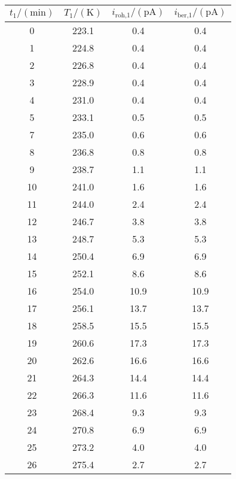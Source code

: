 \label{tab:tabData1_1}
	\begin{tabular}{S[table-format=2.0]S[table-format=3.1]S[table-format=2.1]S[table-format=2.1]}
		\toprule
		{$t_\text{1}/(\si{\minute})$} & {$T_\text{1}/(\si{\kelvin})$} & {$i_\text{roh,1}/(\si{\pico\ampere})$} & {$i_\text{ber,1}/(\si{\pico\ampere})$} \\
		 & 223.1 & 0.4 & 0.4 \\
		 1 & 224.8 & 0.4 & 0.4 \\
		 2 & 226.8 & 0.4 & 0.4 \\
		 3 & 228.9 & 0.4 & 0.4 \\
		 4 & 231.0 & 0.4 & 0.4 \\
		 5 & 233.1 & 0.5 & 0.5 \\
		 7 & 235.0 & 0.6 & 0.6 \\
		 8 & 236.8 & 0.8 & 0.8 \\
		 9 & 238.7 & 1.1 & 1.1 \\
		10 & 241.0 & 1.6 & 1.6 \\
		11 & 244.0 & 2.4 & 2.4 \\
		12 & 246.7 & 3.8 & 3.8 \\
		13 & 248.7 & 5.3 & 5.3 \\
		14 & 250.4 & 6.9 & 6.9 \\
		15 & 252.1 & 8.6 & 8.6 \\
		16 & 254.0 & 10.9 & 10.9 \\
		17 & 256.1 & 13.7 & 13.7 \\
		18 & 258.5 & 15.5 & 15.5 \\
		19 & 260.6 & 17.3 & 17.3 \\
		20 & 262.6 & 16.6 & 16.6 \\
		21 & 264.3 & 14.4 & 14.4 \\
		22 & 266.3 & 11.6 & 11.6 \\
		23 & 268.4 & 9.3 & 9.3 \\
		24 & 270.8 & 6.9 & 6.9 \\
		25 & 273.2 & 4.0 & 4.0 \\
		26 & 275.4 & 2.7 & 2.7 \\
		\bottomrule
	\end{tabular}
